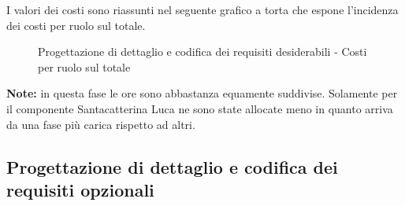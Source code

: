 				\noindent
				I valori dei costi sono riassunti nel seguente grafico a torta che espone l’incidenza dei costi per ruolo sul totale.
				\begin{center}
					\begin{figure}[htbp]
					\vspace{0.8cm}
					\caption{Progettazione di dettaglio e codifica dei requisiti desiderabili - Costi per ruolo sul totale}
					\end{figure}
				\end{center}
		\noindent
		\textbf{Note:} in questa fase le ore sono abbastanza equamente suddivise. Solamente per il componente Santacatterina Luca ne sono state allocate meno in quanto arriva da una fase più carica rispetto ad altri.
	
	\newpage
	\subsection{Progettazione di dettaglio e codifica dei requisiti opzionali} %
	\label{sub:progettazione_di_dettaglio_e_codifica_dei_requisiti_opzionali}
